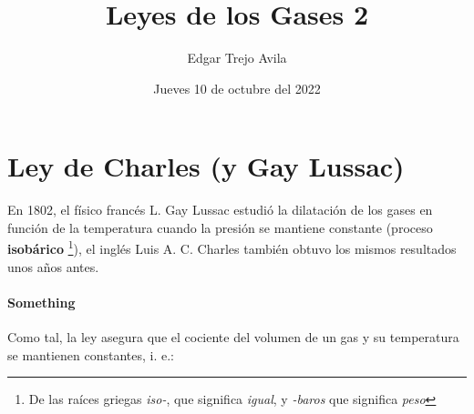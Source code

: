 \documentclass{article}
\title{Leyes de los Gases 2}
\author{Edgar Trejo Avila}
\date{Jueves 10 de octubre del 2022}
\begin{document}
\maketitle

\section*{Ley de Charles (y Gay Lussac)}

En 1802, el físico francés L. Gay Lussac 
estudió la dilatación de los gases en función
de la temperatura cuando la presión se
mantiene constante (proceso \textbf{isobárico} \footnote{De las raíces griegas \textit{iso-}, que significa \textit{igual}, y \textit{-baros} que significa \textit{peso}}),
el inglés Luis A. C. Charles también obtuvo los
mismos resultados unos años antes.

\paragraph*{Something}

Como tal, la ley asegura que el cociente del 
volumen de un gas y su temperatura se mantienen
constantes, i. e.:
\end{document}
